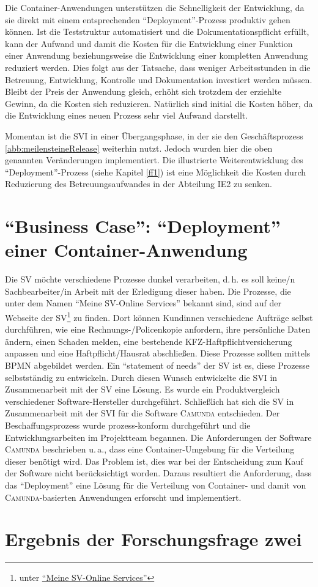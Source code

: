 \par
Die Container-Anwendungen unterstützen die Schnelligkeit der Entwicklung, da sie direkt mit einem entsprechenden \enquote{Deployment}-Prozess produktiv gehen können. Ist die Teststruktur automatisiert und die Dokumentationspflicht erfüllt, kann der Aufwand und damit die Kosten für die Entwicklung einer Funktion einer Anwendung beziehungsweise die Entwicklung einer kompletten Anwendung reduziert werden. Dies folgt aus der Tatsache, dass weniger Arbeitsstunden in die Betreuung, Entwicklung, Kontrolle und Dokumentation investiert werden müssen. Bleibt der Preis der Anwendung gleich, erhöht sich trotzdem der erziehlte Gewinn, da die Kosten sich reduzieren. Natürlich sind initial die Kosten höher, da die Entwicklung eines neuen Prozess sehr viel Aufwand darstellt.
\par
Momentan ist die \ac{SVI} in einer Übergangsphase, in der sie den Geschäftsprozess \vref{abb:meilensteineRelease} weiterhin nutzt. Jedoch wurden hier die oben genannten Veränderungen implementiert. Die illustrierte Weiterentwicklung des \enquote{Deployment}-Prozess (siehe Kapitel \vref{ff1}) ist eine Möglichkeit die Kosten durch Reduzierung des Betreuungsaufwandes in der Abteilung \ac{IE2} zu senken.

\section{\enquote{Business Case}: \enquote{Deployment} einer Container-Anwendung}
Die \ac{SV} möchte verschiedene Prozesse dunkel verarbeiten, d.\,h. es soll keine/n Sachbearbeiter/in Arbeit mit der Erledigung dieser haben. Die Prozesse, die unter dem Namen \enquote{Meine \ac{SV}-Online Services} bekannt sind, sind auf der Webseite der \ac{SV}\footnote{unter \href{https://www.sparkassenversicherung.de/content/privatkunden/service/daten/index.html}{\enquote{Meine \ac{SV}-Online Services}}} zu finden. Dort können Kundinnen verschiedene Aufträge selbst durchführen, wie eine Rechnungs-/Policenkopie anfordern, ihre persönliche Daten ändern, einen Schaden melden, eine bestehende KFZ-Haftpflichtversicherung anpassen und eine Haftpflicht/Hausrat abschließen. Diese Prozesse sollten mittels \ac{BPMN} abgebildet werden. Ein \enquote{statement of needs} der \ac{SV} ist es, diese Prozesse selbstständig zu entwickeln. Durch diesen Wunsch entwickelte die \ac{SVI} in Zusammenarbeit mit der \ac{SV} eine Lösung. Es wurde ein Produktvergleich verschiedener Software-Hersteller durchgeführt. Schließlich hat sich die \ac{SV} in Zusammenarbeit mit der \ac{SVI} für die Software \textsc{Camunda} entschieden. Der Beschaffungsprozess wurde prozess-konform durchgeführt und die Entwicklungsarbeiten im Projektteam begannen. Die Anforderungen der Software \textsc{Camunda} beschrieben u.\,a., dass eine Container-Umgebung für die Verteilung dieser benötigt wird. Das Problem ist, dies war bei der Entscheidung zum Kauf der Software nicht berücksichtigt worden. Daraus resultiert die Anforderung, dass das \enquote{Deployment} eine Lösung für die Verteilung von Container- und damit von \textsc{Camunda}-basierten Anwendungen erforscht und implementiert. 


\section{Ergebnis der Forschungsfrage zwei}
